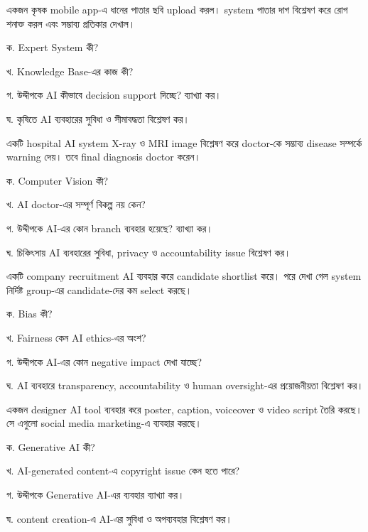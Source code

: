\begin{topicbody}
একজন কৃষক mobile app-এ ধানের পাতার ছবি upload করল। system পাতার দাগ বিশ্লেষণ করে রোগ শনাক্ত করল এবং সম্ভাব্য প্রতিকার দেখাল।

\begin{compactenum}
\item ক. Expert System কী?
\item খ. Knowledge Base-এর কাজ কী?
\item গ. উদ্দীপকে AI কীভাবে decision support দিচ্ছে? ব্যাখ্যা কর।
\item ঘ. কৃষিতে AI ব্যবহারের সুবিধা ও সীমাবদ্ধতা বিশ্লেষণ কর।
\end{compactenum}

একটি hospital AI system X-ray ও MRI image বিশ্লেষণ করে doctor-কে সম্ভাব্য disease সম্পর্কে warning দেয়। তবে final diagnosis doctor করেন।

\begin{compactenum}
\item ক. Computer Vision কী?
\item খ. AI doctor-এর সম্পূর্ণ বিকল্প নয় কেন?
\item গ. উদ্দীপকে AI-এর কোন branch ব্যবহার হয়েছে? ব্যাখ্যা কর।
\item ঘ. চিকিৎসায় AI ব্যবহারের সুবিধা, privacy ও accountability issue বিশ্লেষণ কর।
\end{compactenum}

একটি company recruitment AI ব্যবহার করে candidate shortlist করে। পরে দেখা গেল system নির্দিষ্ট group-এর candidate-দের কম select করছে।

\begin{compactenum}
\item ক. Bias কী?
\item খ. Fairness কেন AI ethics-এর অংশ?
\item গ. উদ্দীপকে AI-এর কোন negative impact দেখা যাচ্ছে?
\item ঘ. AI ব্যবহারে transparency, accountability ও human oversight-এর প্রয়োজনীয়তা বিশ্লেষণ কর।
\end{compactenum}

একজন designer AI tool ব্যবহার করে poster, caption, voiceover ও video script তৈরি করছে। সে এগুলো social media marketing-এ ব্যবহার করছে।

\begin{compactenum}
\item ক. Generative AI কী?
\item খ. AI-generated content-এ copyright issue কেন হতে পারে?
\item গ. উদ্দীপকে Generative AI-এর ব্যবহার ব্যাখ্যা কর।
\item ঘ. content creation-এ AI-এর সুবিধা ও অপব্যবহার বিশ্লেষণ কর।
\end{compactenum}


\end{topicbody}
